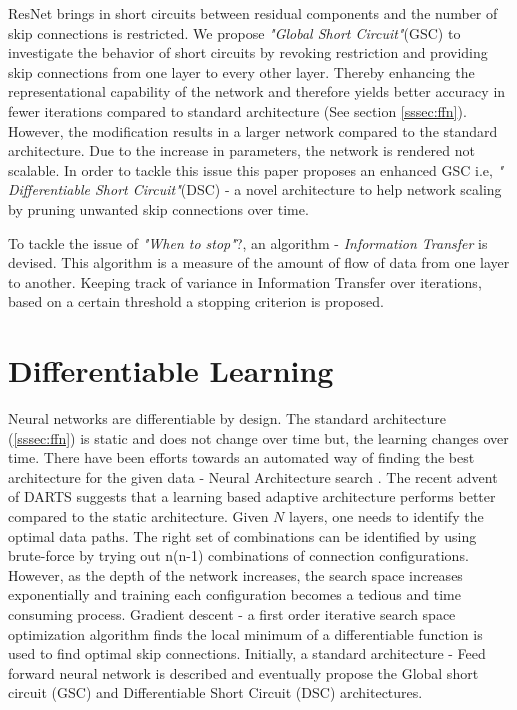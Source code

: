 \documentclass{article}
\begin{document}
ResNet brings in short circuits between residual components and the number of skip connections is restricted. We propose \emph{"Global Short Circuit"}(GSC) to investigate the behavior of short circuits by revoking restriction and providing skip connections from one layer to every other layer. Thereby enhancing the representational capability of the network and therefore yields better accuracy in fewer iterations compared to standard architecture (See section \ref{sssec:ffn}). However, the modification results in a larger network compared to the standard architecture. Due to the increase in parameters, the network is rendered not scalable. In order to tackle this issue this paper proposes an enhanced GSC i.e, \emph{" Differentiable Short Circuit"}(DSC) - a novel architecture to help network scaling by pruning unwanted skip connections over time.

To tackle the issue of \emph{"When to stop"}?, an algorithm - \emph{Information Transfer} is devised. This algorithm is a measure of the amount of flow of data from one layer to another. Keeping track of variance in Information Transfer over iterations, based on a certain threshold a stopping criterion is proposed.

\section{Differentiable Learning}
\label{sec:headings}

Neural networks are differentiable by design. The standard architecture (\ref{sssec:ffn}) is static and does not change over time but, the learning changes over time. There have been efforts towards an automated way of finding the best architecture for the given data - Neural Architecture search \cite{Zoph2016NeuralAS}. The recent advent of DARTS \cite{Liu2019DARTSDA} suggests that a learning based adaptive architecture performs better compared to the static architecture. Given $N$ layers, one needs to identify the optimal data paths. The right set of combinations can be identified by using brute-force by trying out n(n-1) combinations of connection configurations. However, as the depth of the network increases, the search space increases exponentially and training each configuration becomes a tedious and time consuming process. Gradient descent \cite{ruder2016overview} - a first order iterative search space optimization algorithm finds the local minimum of a differentiable function is used to find optimal skip connections. Initially, a standard architecture - Feed forward neural network is described and eventually propose the Global short circuit (GSC) and Differentiable Short Circuit (DSC) architectures.
\end{document}
